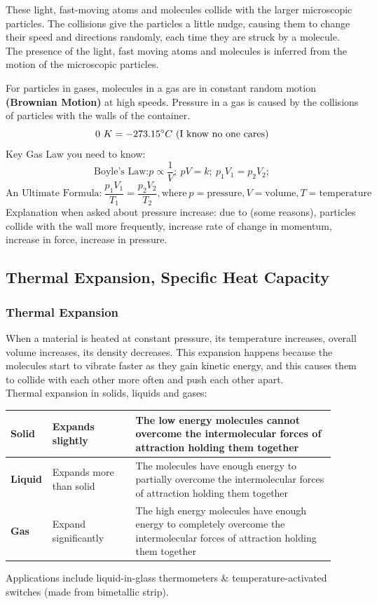 \documentclass[a4paper,12pt]{article}
\begin{document}
\begin{center}
These light, fast-moving atoms and molecules collide with the larger microscopic particles. The collisions give the particles a little nudge, causing them to change their speed and directions randomly, each time they are struck by a molecule. The presence of the light, fast moving atoms and molecules is inferred from the motion of the microscopic particles.
\end{center}
For particles in gases, molecules in a gas are in constant random motion \textbf{(Brownian Motion)} at high speeds. Pressure in a gas is caused by the collisions of particles with the walls of the container.
\[0\ K= -273.15\degree C\ \text{(I know no one cares)}\]
Key Gas Law you need to know:
\[\text{Boyle's Law:} p\propto \frac{1}{V};\ pV=k;\ p_1V_1=p_2V_2;\]
\[\text{An Ultimate Formula:}\ \frac{p_1V_1}{T_1}=\frac{p_2V_2}{T_2}, \text{where}\ p= \text{pressure}, V=\text{volume}, T=\text{temperature}\]
Explanation when asked about pressure increase: due to (some reasons), particles collide with the wall more frequently, increase rate of change in momentum, increase in force, increase in pressure. 
\subsection{Thermal Expansion, Specific Heat Capacity}
\subsubsection{Thermal Expansion}
When a material is heated at constant pressure, its temperature increases, overall volume increases, its density decreases. This expansion happens because the molecules start to vibrate faster as they gain kinetic energy, and this causes them to collide with each other more often and push each other apart.\\
Thermal expansion in solids, liquids and gases:
\begin{center}
\begin{tabular}{|>{\centering\arraybackslash}p{0.07\linewidth}|>{\centering\arraybackslash}p{0.25\linewidth}|>{\centering\arraybackslash}p{0.6\linewidth}|}\hline
    \textbf{Solid} & Expands slightly& The low energy molecules cannot overcome the intermolecular forces of attraction holding them together\\\hline
    \textbf{Liquid} & Expands more than solid& The molecules have enough energy to partially overcome the intermolecular forces of attraction holding them together\\\hline
    \textbf{Gas} & Expand significantly& The high energy molecules have enough energy to completely overcome the intermolecular forces of attraction holding them together\\\hline
\end{tabular}
\end{center}
Applications include liquid-in-glass thermometers \& temperature-activated switches (made from bimetallic strip). 
\end{document}
